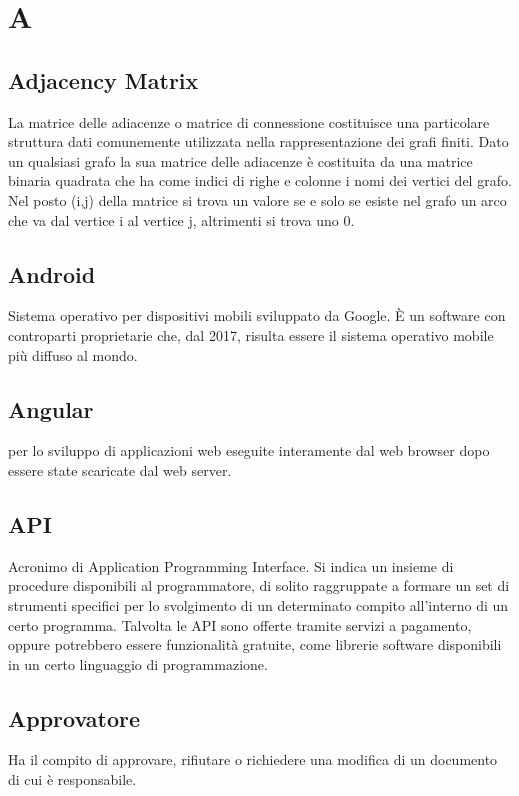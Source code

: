 \section*{A}
\markright{}

\subsection*{Adjacency Matrix}
La matrice delle adiacenze o matrice di connessione costituisce una particolare struttura dati comunemente utilizzata nella rappresentazione dei grafi finiti.
Dato un qualsiasi grafo la sua matrice delle adiacenze è costituita da una matrice binaria quadrata che ha come indici di righe e colonne i nomi dei vertici del grafo. Nel posto (i,j) della matrice si trova un valore se e solo se esiste nel grafo un arco che va dal vertice i al vertice j, altrimenti si trova uno 0.

\subsection*{Android}
Sistema operativo per dispositivi mobili sviluppato da Google. È un software  con controparti proprietarie che, dal 2017, risulta essere il sistema operativo mobile più diffuso al mondo. 
 
\subsection*{Angular}
  per lo sviluppo di applicazioni web eseguite interamente dal web browser dopo essere state scaricate dal web server.

\subsection*{API}
Acronimo di Application Programming Interface. Si indica un  insieme  di  procedure disponibili al programmatore, di solito  raggruppate a formare un set di strumenti specifici per lo svolgimento di un determinato compito all'interno di un certo programma. Talvolta le API sono offerte tramite servizi a pagamento, oppure potrebbero essere funzionalità gratuite, come librerie software disponibili in un certo linguaggio di programmazione.

\subsection*{Approvatore}
Ha il compito di approvare, rifiutare o richiedere una modifica di un documento di cui è responsabile.

